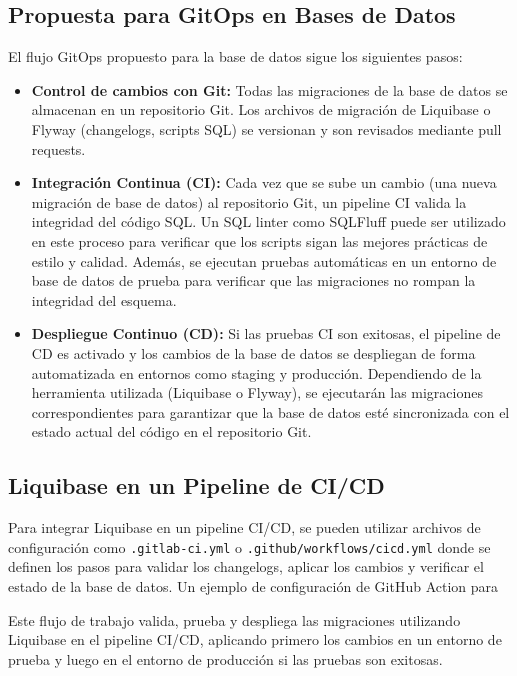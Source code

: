 \documentclass{IEEEtran}
\begin{document}
\subsection{Propuesta para GitOps en Bases de Datos}
El flujo GitOps propuesto para la base de datos sigue los siguientes pasos:

\begin{itemize}
    \item \textbf{Control de cambios con Git:} Todas las migraciones de la base de datos se almacenan en un repositorio Git. Los archivos de migración de Liquibase o Flyway (changelogs, scripts SQL) se versionan y son revisados mediante pull requests.
    \item \textbf{Integración Continua (CI):} Cada vez que se sube un cambio (una nueva migración de base de datos) al repositorio Git, un pipeline CI valida la integridad del código SQL. Un SQL linter como SQLFluff puede ser utilizado en este proceso para verificar que los scripts sigan las mejores prácticas de estilo y calidad. Además, se ejecutan pruebas automáticas en un entorno de base de datos de prueba para verificar que las migraciones no rompan la integridad del esquema.
    \item \textbf{Despliegue Continuo (CD):} Si las pruebas CI son exitosas, el pipeline de CD es activado y los cambios de la base de datos se despliegan de forma automatizada en entornos como staging y producción. Dependiendo de la herramienta utilizada (Liquibase o Flyway), se ejecutarán las migraciones correspondientes para garantizar que la base de datos esté sincronizada con el estado actual del código en el repositorio Git.
\end{itemize}

\subsection{Liquibase en un Pipeline de CI/CD}
Para integrar Liquibase en un pipeline CI/CD, se pueden utilizar archivos de configuración como \texttt{.gitlab-ci.yml} o \texttt{.github/workflows/cicd.yml} donde se definen los pasos para validar los changelogs, aplicar los cambios y verificar el estado de la base de datos. Un ejemplo de configuración de GitHub Action para 

Este flujo de trabajo valida, prueba y despliega las migraciones utilizando Liquibase en el pipeline CI/CD, aplicando primero los cambios en un entorno de prueba y luego en el entorno de producción si las pruebas son exitosas.
\end{document}
